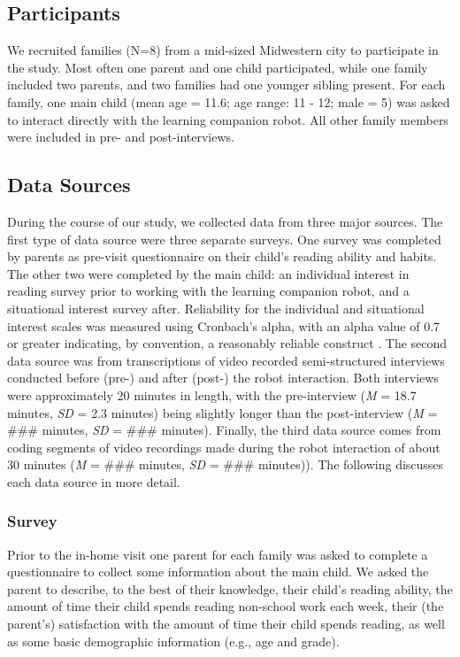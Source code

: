 \documentclass{sigchi}
\begin{document}
\subsection{Participants}
 We recruited families (N=8) from a mid-sized Midwestern city to participate in the study. Most often one parent and one child participated, while one family included two parents, and two families had one younger sibling present. For each family, one main child (mean age = 11.6; age range: 11 - 12; male = 5) was asked to interact directly with the learning companion robot. All other family members were included in pre- and post-interviews.
 

\subsection{Data Sources}
  During the course of our study, we collected data from three major sources. The first type of data source were three separate surveys. One survey was completed by parents as pre-visit questionnaire on their child's reading ability and habits. The other two were completed by the main child: an individual interest in reading survey prior to working with the learning companion robot, and a situational interest survey after. Reliability for the individual and situational interest scales was measured using Cronbach's alpha, with an alpha value of 0.7 or greater indicating, by convention, a reasonably reliable construct \cite{Crocker:2009}. The second data source was from transcriptions of video recorded semi-structured interviews conducted before (pre-) and after (post-) the robot interaction. Both interviews were approximately 20 minutes in length, with the pre-interview (\textit{M} = 18.7 minutes, \textit{SD} = 2.3 minutes) being slightly longer than the post-interview (\textit{M} = \#\#\# minutes, \textit{SD} = \#\#\# minutes). Finally, the third data source comes from coding segments of video recordings made during the robot interaction of about 30 minutes (\textit{M} = \#\#\# minutes, \textit{SD} = \#\#\# minutes)). The following discusses each data source in more detail.
  
\subsubsection{Survey}

  Prior to the in-home visit one parent for each family was asked to complete a questionnaire to collect some information about the main child. We asked the parent to describe, to the best of their knowledge, their child's reading ability, the amount of time their child spends reading non-school work each week, their (the parent's) satisfaction with the amount of time their child spends reading, as well as some basic demographic information (e.g., age and grade).
 
\end{document}
